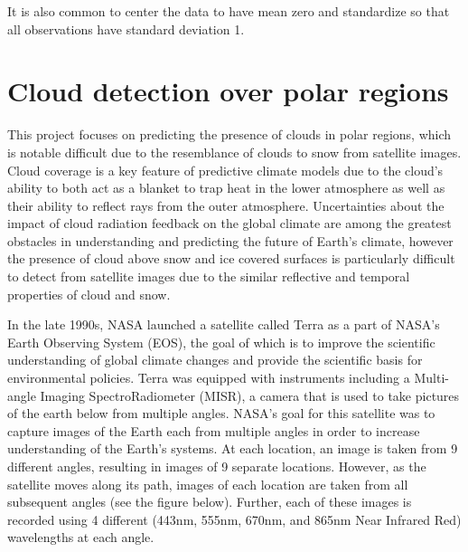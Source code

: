 It is also common to center the data to have mean zero and standardize so that all observations have standard deviation 1. 







\section{Cloud detection over polar regions}

This project focuses on predicting the presence of clouds in polar regions, which is notable difficult due to the resemblance of clouds to snow from satellite images. Cloud coverage is a key feature of predictive climate models due to the cloud's ability to both act as a blanket to trap heat in the lower atmosphere as well as their ability to reflect rays from the outer atmosphere. Uncertainties about the impact of cloud radiation feedback on the global climate are among the greatest obstacles in understanding and predicting the future of Earth's climate, however the presence of cloud above snow and ice covered surfaces is particularly difficult to detect from satellite images due to the similar reflective and temporal properties of cloud and snow. 

In the late 1990s, NASA launched a satellite called Terra as a part of NASA’s Earth Observing System (EOS), the goal of which is to improve the scientific understanding of global climate changes and provide the scientific basis for environmental policies. Terra was equipped with instruments including a Multi-angle Imaging SpectroRadiometer (MISR), a camera that is used to take pictures of the earth below from multiple angles. NASA's goal for this satellite was to capture images of the Earth each from multiple angles in order to increase understanding of the Earth's systems. At each location, an image is taken from 9 different angles, resulting in images of 9 separate locations. However, as the satellite moves along its path, images of each location are taken from all subsequent angles (see the figure below). Further, each of these images is recorded using 4 different (443nm, 555nm, 670nm, and 865nm Near Infrared Red) wavelengths at each angle.

